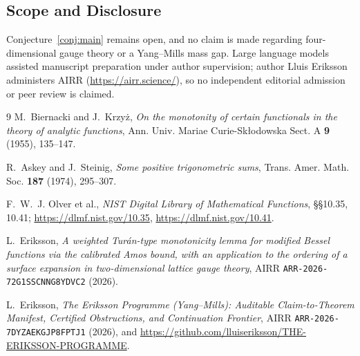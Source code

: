 \documentclass[11pt]{article}
\theoremstyle{remark}
\begin{document}
\subsection*{Scope and Disclosure}
Conjecture~\ref{conj:main} remains open, and no claim is made regarding four-dimensional
gauge theory or a Yang--Mills mass gap. Large language models assisted manuscript
preparation under author supervision; author Lluis Eriksson administers AIRR
(\url{https://airr.science/}), so no independent editorial admission or peer review is
claimed.

\begin{thebibliography}{9}\small
{}
M.~Biernacki and J.~Krzy\.z,
\emph{On the monotonity of certain functionals in the theory of analytic functions},
Ann. Univ. Mariae Curie-Sk{\l}odowska Sect. A \textbf{9} (1955), 135--147.

R.~Askey and J.~Steinig,
\emph{Some positive trigonometric sums},
Trans. Amer. Math. Soc. \textbf{187} (1974), 295--307.

F.~W.~J. Olver et al.,
\emph{NIST Digital Library of Mathematical Functions},
\S\S10.35, 10.41; \url{https://dlmf.nist.gov/10.35}, \url{https://dlmf.nist.gov/10.41}.

L.~Eriksson,
\emph{A weighted Tur\'an-type monotonicity lemma for modified Bessel functions via the
calibrated Amos bound, with an application to the ordering of a surface expansion in
two-dimensional lattice gauge theory},
AIRR \texttt{ARR-2026-72G1SSCNNG8YDVC2} (2026).

L.~Eriksson,
\emph{The Eriksson Programme (Yang--Mills): Auditable Claim-to-Theorem Manifest, Certified
Obstructions, and Continuation Frontier},
AIRR \texttt{ARR-2026-7DYZAEKGJP8FPTJ1} (2026), and
\url{https://github.com/lluiseriksson/THE-ERIKSSON-PROGRAMME}.
\end{thebibliography}
\end{document}
